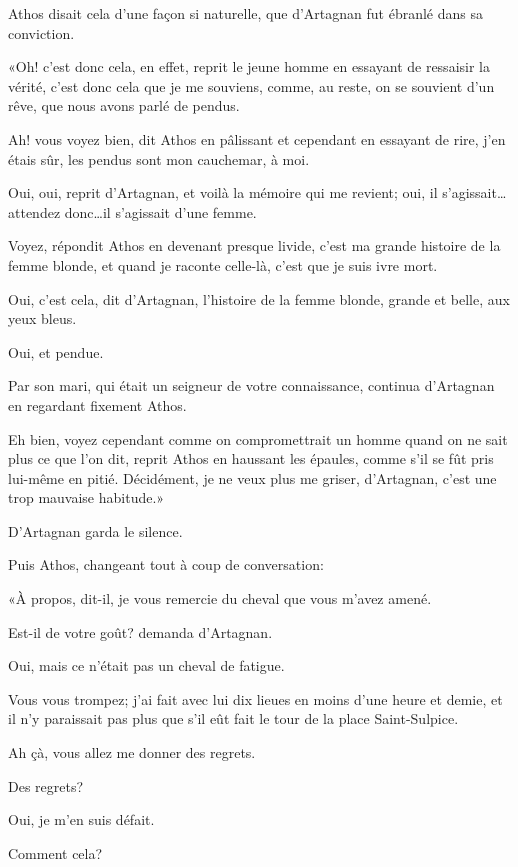 Athos disait cela d'une façon si naturelle, que d'Artagnan fut ébranlé dans sa conviction. 

«Oh! c'est donc cela, en effet, reprit le jeune homme en essayant de ressaisir la vérité, c'est donc cela que je me souviens, comme, au reste, on se souvient d'un rêve, que nous avons parlé de pendus. 

\speak  Ah! vous voyez bien, dit Athos en pâlissant et cependant en essayant de rire, j'en étais sûr, les pendus sont mon cauchemar, à moi. 

\speak  Oui, oui, reprit d'Artagnan, et voilà la mémoire qui me revient; oui, il s'agissait\dots attendez donc\dots il s'agissait d'une femme. 

\speak  Voyez, répondit Athos en devenant presque livide, c'est ma grande histoire de la femme blonde, et quand je raconte celle-là, c'est que je suis ivre mort. 

\speak  Oui, c'est cela, dit d'Artagnan, l'histoire de la femme blonde, grande et belle, aux yeux bleus. 

\speak  Oui, et pendue. 

\speak  Par son mari, qui était un seigneur de votre connaissance, continua d'Artagnan en regardant fixement Athos. 

\speak  Eh bien, voyez cependant comme on compromettrait un homme quand on ne sait plus ce que l'on dit, reprit Athos en haussant les épaules, comme s'il se fût pris lui-même en pitié. Décidément, je ne veux plus me griser, d'Artagnan, c'est une trop mauvaise habitude.» 

D'Artagnan garda le silence. 

Puis Athos, changeant tout à coup de conversation: 

«À propos, dit-il, je vous remercie du cheval que vous m'avez amené. 

\speak  Est-il de votre goût? demanda d'Artagnan. 

\speak  Oui, mais ce n'était pas un cheval de fatigue. 

\speak  Vous vous trompez; j'ai fait avec lui dix lieues en moins d'une heure et demie, et il n'y paraissait pas plus que s'il eût fait le tour de la place Saint-Sulpice. 

\speak  Ah çà, vous allez me donner des regrets. 

\speak  Des regrets? 

\speak  Oui, je m'en suis défait. 

\speak  Comment cela? 

